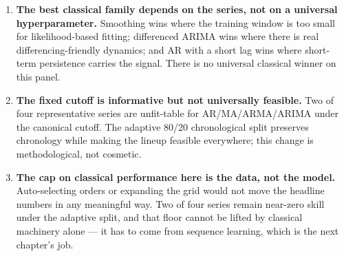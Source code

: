 \begin{enumerate}
  \item \textbf{The best classical family depends on the series, not on a universal hyperparameter.} Smoothing wins where the training window is too small for likelihood-based fitting; differenced ARIMA wins where there is real differencing-friendly dynamics; and AR with a short lag wins where short-term persistence carries the signal. There is no universal classical winner on this panel.
  \item \textbf{The fixed cutoff is informative but not universally feasible.} Two of four representative series are unfit-table for AR/MA/ARMA/ARIMA under the canonical cutoff. The adaptive 80/20 chronological split preserves chronology while making the lineup feasible everywhere; this change is methodological, not cosmetic.
  \item \textbf{The cap on classical performance here is the data, not the model.} Auto-selecting orders or expanding the grid would not move the headline numbers in any meaningful way. Two of four series remain near-zero skill under the adaptive split, and that floor cannot be lifted by classical machinery alone --- it has to come from sequence learning, which is the next chapter's job.
\end{enumerate}
